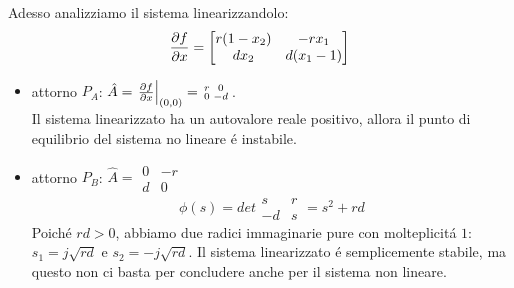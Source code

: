 \documentclass[../main.tex]{subfiles}
\begin{document}
		\noindent
		Adesso analizziamo il sistema linearizzandolo:
		\[ 
			\frac{\partial f}{\partial x} = 
			\begin{bmatrix}
				r(1-x_2) & -r x_1\\
				d x_2 & d(x_1-1)
			\end{bmatrix}
		\]
		\begin{itemize}
			\item
				attorno $ P_A $: $ \hat A = \left. \frac{\partial f}{\partial x} \right|_{(0,0)} = \begin{smallmatrix} r & 0\\ 0 & -d \end{smallmatrix} $.\\
				Il sistema linearizzato ha un autovalore reale positivo, allora il punto di equilibrio del sistema no lineare \'e instabile.
			\item
				attorno $ P_B $: $ \hat A = \begin{smallmatrix} 0 & -r\\ d & 0 \end{smallmatrix} $
				\[ \phi(s) = det \begin{smallmatrix} s & r\\ -d & s \end{smallmatrix} = s^2 + rd \]
				Poich\'e $ rd > 0 $, abbiamo due radici immaginarie pure con molteplicit\'a $ 1 $: $ s_1 = j\sqrt{rd} $ e $ s_2 = -j\sqrt{rd} $. Il sistema linearizzato \'e semplicemente stabile, ma questo non ci basta per concludere anche per il sistema non lineare.
		\end{itemize}
\end{document}

